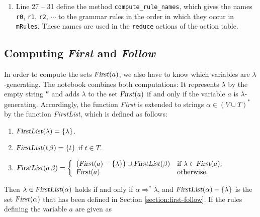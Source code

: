 \begin{enumerate}
      \textsl{Follow}, which are stored in the dictionaries \texttt{mFirst} and \texttt{mFollow}, the names of the
      rules, the states, the action table, and the goto table.  The order of these steps matters:  The computation
      of \textsl{Follow} needs \textsl{First}, the action table needs the states, the function \textsl{Follow}, and
      the names of the rules, and the goto table needs the states.
\item Line 27 -- 31 define the method \texttt{compute\_rule\_names}, which gives the names \texttt{r0},
      \texttt{r1}, \texttt{r2}, $\cdots$ to the grammar rules in the order in which they occur in
      \texttt{mRules}.  These names are used in the \texttt{reduce} actions of the action table.
\end{enumerate}

\subsection{Computing \textsl{First} and \textsl{Follow}}
In order to compute the sets $\textsl{First}(a)$, we also have to know which variables are $\lambda$-generating.
The notebook combines both computations:  It represents $\lambda$ by the empty string \texttt{''} and adds
$\lambda$ to the set $\textsl{First}(a)$ if and only if the variable $a$ is $\lambda$-generating.  Accordingly,
the function \textsl{First} is extended to strings $\alpha \in (V \cup T)^*$ by the function \textsl{FirstList},
which is defined as follows:
\begin{enumerate}
\item $\textsl{FirstList}(\lambda) = \{ \lambda \}$.
\item $\textsl{FirstList}(t\, \beta) = \{ t \}$ \quad if $t \in T$.
\item $\textsl{FirstList}(a\, \beta) = \left\{
       \begin{array}[c]{ll}
         \bigl(\textsl{First}(a) - \{\lambda\}\bigr) \cup \textsl{FirstList}(\beta) &
         \mbox{if $\lambda \in \textsl{First}(a)$;} \\
         \textsl{First}(a) & \mbox{otherwise.}
       \end{array}
       \right.$
\end{enumerate}
Then $\lambda \in \textsl{FirstList}(\alpha)$ holds if and only if $\alpha \Rightarrow^* \lambda$, and
$\textsl{FirstList}(\alpha) - \{\lambda\}$ is the set $\textsl{First}(\alpha)$ that has been defined in Section
\ref{section:first-follow}.  If the rules defining the variable $a$ are given as
